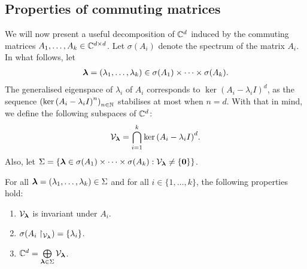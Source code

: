 \subsection{Properties of commuting matrices}

We will now present a useful decomposition of $\mathbb{C}^{d}$ induced by the commuting matrices $A_{1}, \ldots, A_{k} \in \mathbb{C}^{d \times d}$. Let $\sigma(A_{i})$ denote the spectrum of the matrix $A_{i}$. In what follows, let
\begin{align*}
\boldsymbol{\lambda} = (\lambda_{1}, \ldots, \lambda_{k}) \in \sigma(A_{1}) \times \cdots \times \sigma(A_{k}) .
\end{align*}
The generalised eigenspace of $\lambda_{i}$ of $A_{i}$ corresponds to $\ker{(A_{i} - \lambda_{i} I)}^{d}$, as the sequence ${(\ker{(A_{i} - \lambda_{i} I)}^{n})}_{n \in \mathbb{N}}$ stabilises at most when $n=d$. With that in mind, we define the following subspaces of $\mathbb{C}^{d}$:
\begin{align*}
\mathcal{V}_{\boldsymbol{\lambda}} = \bigcap \limits_{i=1}^{k} \ker{(A_{i} - \lambda_{i} I)}^{d}.
\end{align*}
Also, let $\Sigma = \lbrace \boldsymbol{\lambda} \in \sigma(A_{1}) \times \cdots \times \sigma(A_{k}) : \mathcal{V}_{\boldsymbol{\lambda}} \neq \lbrace \boldsymbol{0} \rbrace \rbrace$.

\begin{theorem}
\label{subspace_decomposition}
For all $\boldsymbol{\lambda} = (\lambda_{1}, \ldots, \lambda_{k}) \in \Sigma$ and for all $i \in \lbrace 1, \ldots, k \rbrace$, the following properties hold:

\begin{enumerate}

\item $\mathcal{V}_{\boldsymbol{\lambda}}$ is invariant under $A_{i}$.

\item $\sigma(A_{i} \restriction_{\mathcal{V}_{\boldsymbol{\lambda}}}) = \lbrace \lambda_{i} \rbrace$.

\item $\mathbb{C}^{d} = \bigoplus \limits_{\boldsymbol{\lambda} \in \Sigma} \mathcal{V}_{\boldsymbol{\lambda}}$.

\end{enumerate}
\end{theorem}

